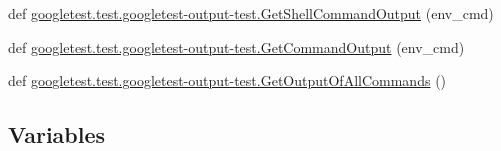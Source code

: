 \begin{DoxyCompactItemize}
\item 
def \mbox{\hyperlink{namespacegoogletest_1_1test_1_1googletest-output-test_aa5a7ea5b9a73e1538841493ed39fcca6}{googletest.\+test.\+googletest-\/output-\/test.\+Get\+Shell\+Command\+Output}} (env\+\_\+cmd)
\item 
def \mbox{\hyperlink{namespacegoogletest_1_1test_1_1googletest-output-test_a57e27de68d1c4a6ae2fea7321123060b}{googletest.\+test.\+googletest-\/output-\/test.\+Get\+Command\+Output}} (env\+\_\+cmd)
\item 
def \mbox{\hyperlink{namespacegoogletest_1_1test_1_1googletest-output-test_a7baabb9ec5690eff9a0985fb468c21da}{googletest.\+test.\+googletest-\/output-\/test.\+Get\+Output\+Of\+All\+Commands}} ()
\end{DoxyCompactItemize}
\subsection*{Variables}
